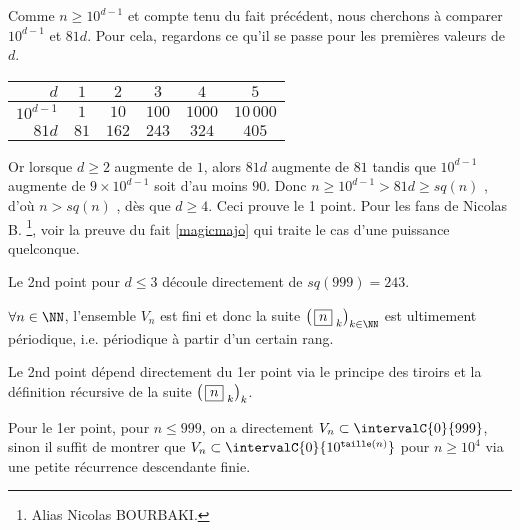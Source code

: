 \begin{proof*}
	Comme $n \geqslant 10^{d-1}$ et compte tenu du fait précédent, nous cherchons à comparer $10^{d-1}$ et $81d$.
	Pour cela, regardons ce qu'il se passe pour les premières valeurs de $d$.

	\smallskip
	\begin{center}
		\begin{tabular}{|r|c|c|c|c|c|}
			\hline
				$d$        & $1$  & $2$   & $3$   & $4$    & $5$        \\
			\hline
				$10^{d-1}$ & $1$  & $10$  & $100$ & $1000$ & $10\,000$  \\
			\hline
				$81d$      & $81$ & $162$ & $243$ & $324$  & $405$      \\
			\hline
		\end{tabular}
	\end{center}
	\smallskip
	
	Or lorsque $d \geqslant 2$ augmente de $1$, alors $81d$ augmente de $81$ tandis que $10^{d-1}$ augmente de $9\times10^{d-1}$ soit d'au moins $90$.
	Donc $n \geqslant 10^{d-1} > 81d \geqslant sq(n)$ , d'où $n > sq(n)$ , dès que $d \geqslant 4$.
	Ceci prouve le 1\ier{} point.
	Pour les fans de Nicolas B.
	\footnote{
		Alias Nicolas BOURBAKI.
	}, 
	voir la preuve  du fait \ref{magicmajo} qui traite le cas d'une puissance quelconque.


	\bigskip
	
	Le 2nd point pour $d \leqslant 3$ découle directement de $sq(999) = 243$.
\end{proof*}




\medskip

\begin{fact}
	$\forall n \in \NN$, l'ensemble $V_n$ est fini et donc la suite $\left( \, \sqseq{n}{k} \right)_{k \in \NN}$ est ultimement périodique, i.e. périodique à partir d'un certain rang.
\end{fact}

\begin{proof*}
	Le 2nd point dépend directement du 1er point via le principe des tiroirs et la définition récursive de la suite $\left( \, \fbox{$n$}_{\,\,k} \right)_k$.
	
	\medskip
	
	Pour le 1er point, pour $n \leqslant 999$, on a directement $V_n \subset \intervalC{0}{999}$,
	sinon il suffit de montrer que $V_n \subset \intervalC{0}{10^{\taille(n)}}$ pour $n \geqslant 10^4$ via une petite récurrence descendante finie.
\end{proof*}